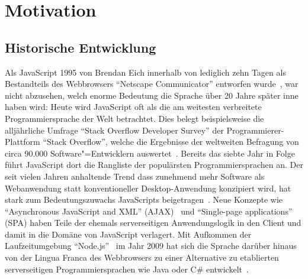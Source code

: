 \chapter{Motivation}
\label{chap:motiviation}

\section{Historische Entwicklung}

Als JavaScript 1995 von Brendan Eich innerhalb von lediglich zehn Tagen als Bestandteils des Webbrowsers \enquote{Netscape Communicator} entworfen wurde~\autocite{severance:2012:js10days}, war nicht abzusehen, welch enorme Bedeutung die Sprache über 20 Jahre später inne haben wird: Heute wird JavaScript oft als die am weitesten verbreitete Programmiersprache der Welt betrachtet. Dies belegt beispielsweise die alljährliche Umfrage \enquote{Stack Overflow Developer Survey} der Programmierer-Plattform \enquote{Stack Overflow}, welche die Ergebnisse der weltweiten Befragung von circa 90.000 Software"=Entwicklern auswertet~\autocite{STACKOVERFLOW:SURVEY}. Bereits das siebte Jahr in Folge führt JavaScript dort die Rangliste der populärsten Programmiersprachen an. Der seit vielen Jahren anhaltende Trend dass zunehmend mehr Software als Webanwendung statt konventioneller Desktop-Anwendung konzipiert wird, hat stark zum Bedeutungszuwachs JavaScripts beigetragen~\autocite{TAIVALSAARI:2017,CASTELEYN:2014}. Neue Konzepte wie \enquote{Asynchronous JavaScript and XML} (AJAX)~\autocite{GARRET:AJAX} und \enquote{Single-page applications} (SPA) haben Teile der ehemals serverseitigen Anwendungslogik in den Client und damit in die Domäne von JavaScript verlagert. Mit Aufkommen der Laufzeitumgebung \enquote{Node.js}~\autocite{SOFTWARE:NODEJS} im Jahr 2009 hat sich die Sprache darüber hinaus von der Lingua Franca des Webbrowsers zu einer Alternative zu etablierten serverseitigen Programmiersprachen wie Java oder C\# entwickelt~\autocite{TILKOV:NODEJS}.


